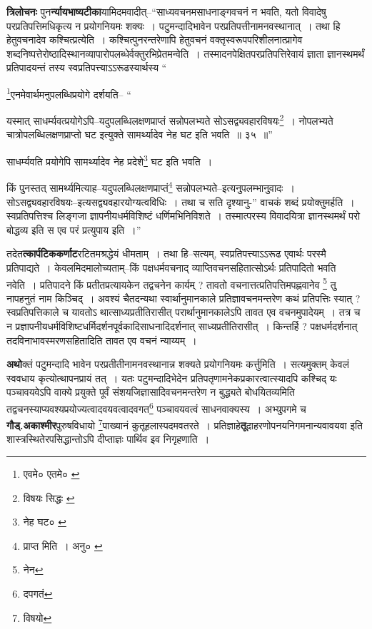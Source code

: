 \documentclass[article,12pt,a4paper]{memoir}
\begin{document}
	  \pstart \textbf{त्रिलोचनः} पुन\textbf{र्न्यायभाष्यटीका}यामिदमवादीत्--“साध्यवचनमसाधनाङ्गवचनं न भवति, यतो विवादेषु परप्रतिपत्तिमधिकृत्य न प्रयोगनियमः शक्यः । पटुमन्दादिभावेन परप्रतिपत्तीनामनवस्थानात् । तथा हि हेतुवचनादेव कश्चित्प्रत्येति । कश्चित्पुनरन्तरेणापि हेतुवचनं वक्तृस्वरूपपरिशीलनात्प्रागेव शब्दनिष्पत्तेरोष्ठादिस्थानव्यापारोपलब्धेर्वक्तुरभिप्रेतमन्वेति । तस्मादनपेक्षितपरप्रतिपत्तिरेवायं ज्ञाता ज्ञानस्थमर्थं प्रतिपादयन्तं तस्य स्वप्रतिपत्त्याऽऽरूढस्यार्थस्य \leavevmode{} “
	  
	\footnote{एवमे० \cite{dp-msA} \cite{dp-msB} \cite{dp-edP} \cite{dp-edH} \cite{dp-edE} एतमे० \cite{dp-edN}}\-एनमेवार्थमनुपलब्धिप्रयोगे दर्शयति-- “
	  
	यस्मात् साधर्म्यवत्प्रयोगेऽपि--यदुपलब्धिलक्षणप्राप्तं सन्नोपलभ्यते सोऽसद्व्यवहारविषयः\footnote{विषयः सिद्धः \cite{dp-msC}} । नोपलभ्यते चात्रोपलब्धिलक्षणप्राप्तो घट इत्युक्ते सामर्थ्यादेव नेह घट इति भवति ॥ ३५ ॥” 
	  
	साधर्म्यवति प्रयोगेपि सामर्थ्यादेव नेह प्रदेशे\footnote{नेह घट० \cite{dp-msA} \cite{dp-msB} \cite{dp-edP} \cite{dp-edH} \cite{dp-edN}} घट इति भवति । 
	  
	किं पुनस्तत् सामर्थ्यमित्याह--यदुपलब्धिलक्षणप्राप्तं\footnote{प्राप्त मिति । अनु० \cite{dp-msA} \cite{dp-edP} \cite{dp-edH}} सन्नोपलभ्यते--इत्यनुपलम्भानुवादः । सोऽसद्व्यवहारविषयः--इत्यसद्व्यवहारयोग्यत्वविधिः । तथा च सति दृश्यानु-” वाचकं शब्दं प्रयोक्तुमर्हति । स्वप्रतिपत्तिश्च लिङ्गजा ज्ञापनीयधर्मविशिष्टं धर्णिमभिनिविशते । तस्मात्परस्य विवादयित्रा ज्ञानस्थमर्थं परो बोद्धव्य इति स एव परं प्रत्युपाय इति ।”
	\pend
      

	  \pstart तदेत\textbf{त्कार्पटिककर्णाट}रटितमश्रद्धेयं धीमताम् । तथा हि--सत्यम्, स्वप्रतिपत्त्याऽऽरूढ एवार्थः परस्मै प्रतिपाद्यते । केवलमिदमालोच्यताम्--किं पक्षधर्मवचनाद् व्याप्तिवचनसहितात्सोऽर्थः प्रतिपादितो भवति नवेति । प्रतिपादने किं प्रतीतप्रत्यायकेन तद्वचनेन कार्यम् ? तावतो वचनात्तत्प्रतिपत्तिमपह्नवानेव \footnote{नेन} तु नापहनुतं नाम किञ्चिद् । अवश्यं चैतदन्यथा स्वार्थानुमानकाले प्रतिज्ञावचनमन्तरेण कथं प्रतिपत्तिः स्यात् ? स्वप्रतिपत्तिकाले च यावतोऽ थात्साध्यप्रतीतिरासीत् परार्थानुमानकालेऽपि तावत एव वचनमुपादेयम् । तत्र च न प्रज्ञापनीयधर्मविशिष्टधर्मिदर्शनपूर्वकादिसाधनादिदर्शनात् साध्यप्रतीतिरासीत् । किन्तर्हि ? पक्षधर्मदर्शनात् तदविनाभावस्मरणसहितादिति तावत एव वचनं न्याय्यम् ।
	\pend
      

	  \pstart \textbf{अथो}क्तं पटुमन्दादि भावेन परप्रतीतीनामनवस्थानान्न शक्यते प्रयोगनियमः कर्त्तुमिति । सत्यमुक्तम्\leavevmode{} केवलं स्ववधाय कृत्योत्थापनप्रायं तत् । यतः पटुमन्दादिभेदेन प्रतिपतृणामनेकप्रकारत्वात्स्यादपि कश्चिद् यः पञ्चावयवेऽपि वाक्ये प्रयुक्ते पूर्वं संशयजिज्ञासादिवचनमन्तरेण न बुद्ध्यते बोधयितव्यमिति तद्वचनस्याप्यवश्यप्रयोज्यत्वादवयवत्वादवगत\footnote{दपगतं} पञ्चावयवत्वं साधनवाक्यस्य । अभ्युपगमे च \textbf{गौड्.अकाश्मीर}पुरुषविधायो \footnote{विषयो}पाख्यानं कुतूहलास्पदमवतरते । प्रतिज्ञाहे\textbf{तू}दाहरणोपनयनिगमनान्यवावयवा इति शास्त्रस्थितेरपसिद्धान्तोऽपि दीप्ताज्ञः पार्थिव इव निगृहणाति ।
	\pend
      
\end{document}
